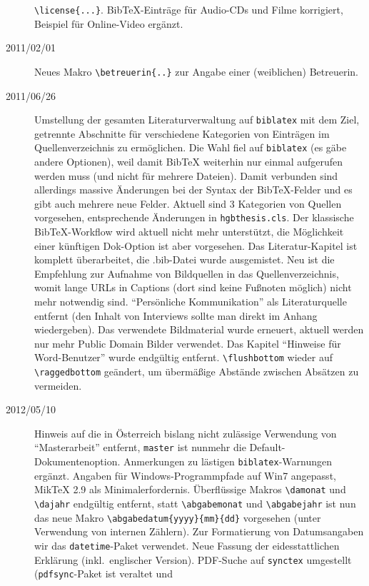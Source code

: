 \begin{sloppypar}
\begin{description}
\verb!\license{...}!.
BibTeX-Einträge für Audio-CDs und Filme korrigiert, Beispiel für Online-Video ergänzt.
\item[2011/02/01]
Neues Makro \verb!\betreuerin{..}! zur Angabe einer (weiblichen) Betreuerin. 
%
\item[2011/06/26]
Umstellung der gesamten Literaturverwaltung auf \texttt{biblatex} mit dem Ziel, 
getrennte Abschnitte für verschiedene Kategorien von Einträgen im Quellenverzeichnis
zu ermöglichen. Die Wahl fiel auf \texttt{biblatex} (es gäbe andere Optionen), weil
damit BibTeX weiterhin nur einmal aufgerufen werden muss (und nicht für
mehrere Dateien). Damit verbunden sind allerdings massive Änderungen bei der
Syntax der BibTeX-Felder und es gibt auch mehrere neue Felder.
Aktuell sind 3 Kategorien von Quellen vorgesehen, entsprechende Änderungen in 
\nolinkurl{hgbthesis.cls}. Der klassische BibTeX-Workflow wird aktuell nicht
mehr unterstützt, die Möglichkeit einer künftigen Dok-Option ist aber 
vorgesehen. Das Literatur-Kapitel ist komplett überarbeitet, die .bib-Datei
wurde ausgemistet. Neu ist die Empfehlung zur Aufnahme von Bildquellen
in das Quellenverzeichnis, womit lange URLs in Captions (dort sind keine
Fußnoten möglich) nicht mehr notwendig sind. 
"`Persönliche Kommunikation"' als Literaturquelle entfernt (den Inhalt
von Interviews sollte man direkt im Anhang wiedergeben).
Das verwendete Bildmaterial wurde
erneuert, aktuell werden nur mehr Public Domain Bilder verwendet. 
Das Kapitel "`Hinweise für Word-Benutzer"' wurde endgültig entfernt.
\verb!\flushbottom! wieder auf \verb!\raggedbottom! geändert, um übermäßige 
Abstände zwischen Absätzen zu vermeiden.
%
\item[2012/05/10]
Hinweis auf die in Österreich bislang nicht zulässige Verwendung von "`Masterarbeit"'
entfernt, \texttt{master} ist nunmehr die Default-Dokumentenoption.
Anmerkungen zu lästigen \texttt{biblatex}-Warnungen ergänzt.
Angaben für Windows-Programmpfade auf Win7 angepasst, 
MikTeX 2.9 als Minimalerfordernis.\newline
Überflüssige Makros \verb!\damonat! und \verb!\dajahr! endgültig entfernt, statt
\verb!\abgabemonat! und \verb!\abgabejahr! ist nun das neue Makro
\verb!\abgabedatum{yyyy}{mm}{dd}! vorgesehen (unter Verwendung von internen Zählern).
Zur Formatierung von Datumsangaben wir das \texttt{datetime}-Paket verwendet.
\newline
Neue Fassung der eidesstattlichen Erklärung (inkl.\ englischer Version).\newline
PDF-Suche auf \texttt{synctex} umgestellt (\texttt{pdfsync}-Paket ist veraltet und

\end{description}
\end{sloppypar}

